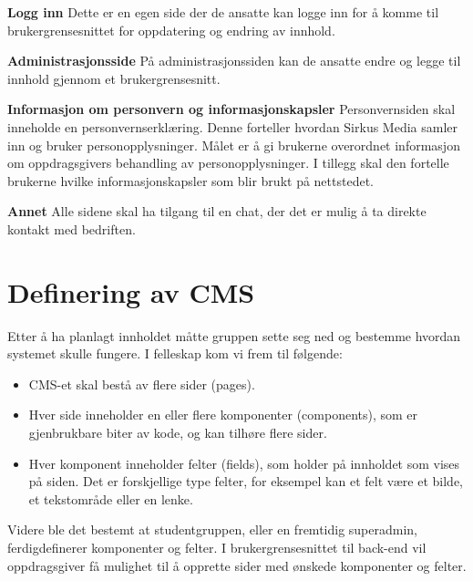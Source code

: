 \textbf{Logg inn} Dette er en egen side der de ansatte kan logge inn for å komme til brukergrensesnittet for oppdatering og endring av innhold.

\textbf{Administrasjonsside}  På administrasjonssiden kan de ansatte endre og legge til innhold gjennom et brukergrensesnitt.

\textbf{Informasjon om personvern og informasjonskapsler} Personvernsiden skal inneholde en personvernserklæring. Denne forteller hvordan Sirkus Media samler inn og bruker personopplysninger. Målet er å gi brukerne overordnet informasjon om oppdragsgivers behandling av personopplysninger. I tillegg skal den fortelle brukerne hvilke informasjonskapsler som blir brukt på nettstedet.

\textbf{Annet} Alle sidene skal ha tilgang til en chat, der det er mulig å ta direkte kontakt med bedriften.

\section{Definering av CMS}
\label{sec-planning-cms}
Etter å ha planlagt innholdet måtte gruppen sette seg ned og bestemme hvordan systemet skulle fungere. I felleskap kom vi frem til følgende:

\begin{itemize}
    \item CMS-et skal bestå av flere sider (pages).
    \item Hver side inneholder en eller flere komponenter (components), som er gjenbrukbare biter av kode, og kan tilhøre flere sider.
    \item Hver komponent inneholder felter (fields), som holder på innholdet som vises på siden. Det er forskjellige type felter, for eksempel kan et felt være et bilde, et tekstområde eller en lenke. 
\end{itemize}

Videre ble det bestemt at studentgruppen, eller en fremtidig superadmin, ferdigdefinerer komponenter og felter. I brukergrensesnittet til back-end vil oppdragsgiver få mulighet til å opprette sider med ønskede komponenter og felter.  

